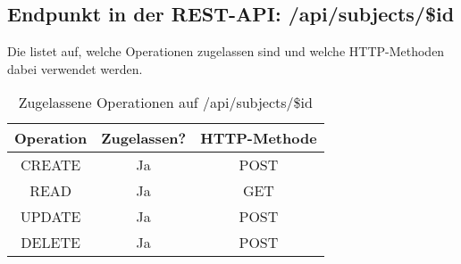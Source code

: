 \subsection{Endpunkt in der REST-API: /api/subjects/\$id}
Die  listet auf, welche Operationen zugelassen sind und welche HTTP-Methoden dabei verwendet werden. 

\begin{table}[!htbp]
	\begin{tabular}{|c|c|c|}
		\hline
			\textbf{Operation} & \textbf{Zugelassen?} & \textbf{HTTP-Methode} \\ \hline
			CREATE & Ja & POST \\ \hline 
			READ & Ja & GET \\ \hline
			UPDATE & Ja & POST \\ \hline 
			DELETE & Ja & POST \\ \hline
	\end{tabular}

		\caption{Zugelassene Operationen auf /api/subjects/\$id}
		\label{tab:end:rest:api:subjects:id:meth}
\end{table}


